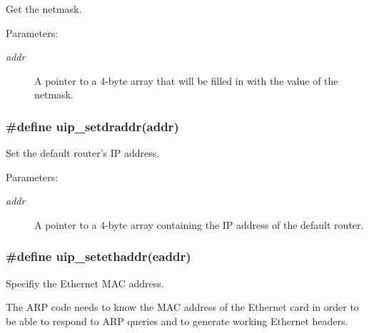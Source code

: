 Get the netmask. 

\begin{Desc}
\item[Parameters:]
\begin{description}
\item[{\em addr}]A pointer to a 4-byte array that will be filled in with the value of the netmask. \end{description}
\end{Desc}
\hypertarget{a00061_g41d37ea1e3bd24f7b51e9409aceaaa80}{
\subsubsection[uip\_\-setdraddr]{\setlength{\rightskip}{0pt plus 5cm}\#define uip\_\-setdraddr(addr)}}
\label{a00061_g41d37ea1e3bd24f7b51e9409aceaaa80}


Set the default router's IP address. 

\begin{Desc}
\item[Parameters:]
\begin{description}
\item[{\em addr}]A pointer to a 4-byte array containing the IP address of the default router. \end{description}
\end{Desc}
\hypertarget{a00061_g30e827f33eacff55ecb4d8fb5a11d5d1}{
\subsubsection[uip\_\-setethaddr]{\setlength{\rightskip}{0pt plus 5cm}\#define uip\_\-setethaddr(eaddr)}}
\label{a00061_g30e827f33eacff55ecb4d8fb5a11d5d1}


Specifiy the Ethernet MAC address. 

The ARP code needs to know the MAC address of the Ethernet card in order to be able to respond to ARP queries and to generate working Ethernet headers.

